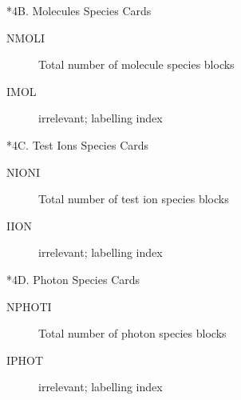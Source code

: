 *4B.
Molecules Species Cards
\begin{description}
  \item[NMOLI] Total number of
        molecule species blocks
  \item[IMOL] irrelevant; labelling index
\end{description}

*4C.
Test Ions Species Cards
\begin{description}
  \item[NIONI] Total number of test
        ion species blocks
  \item[IION] irrelevant; labelling index
\end{description}

*4D.
Photon Species Cards
\begin{description}
  \item[NPHOTI] Total number of photon
        species blocks
  \item[IPHOT] irrelevant; labelling index
\end{description}

